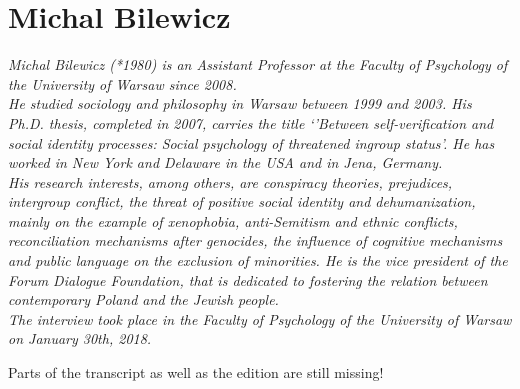 \section{Michal Bilewicz}
\textit{Michal Bilewicz (*1980) is an Assistant Professor at the Faculty of Psychology of the University of Warsaw since 2008. \\
He studied sociology and philosophy in Warsaw between 1999 and 2003. His Ph.D. thesis, completed in 2007, carries the title `'Between self-verification and social identity processes: Social psychology of threatened ingroup status'. 
He has worked in New York and Delaware in the USA and in Jena, Germany. \\
His research interests, among others, are conspiracy theories, prejudices, intergroup conflict, the threat of positive social identity and dehumanization, mainly on the example of xenophobia, anti-Semitism and ethnic conflicts, reconciliation mechanisms after genocides, the influence of cognitive mechanisms and public language on the exclusion of minorities.
He is the vice president of the Forum Dialogue Foundation, that is dedicated to fostering the relation between contemporary Poland and the Jewish people. \\
The interview took place in the Faculty of Psychology of the University of Warsaw on January 30th, 2018.}

Parts of the transcript as well as the edition are still missing!